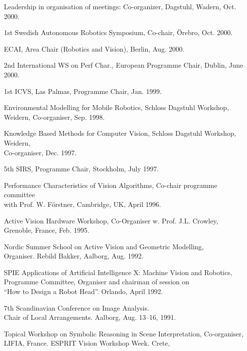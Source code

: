 \documentclass{article}
\begin{document}
\begin{cv}
\begin{cvlist}{Leadership in organisation of meetings:}
  Co-organizer, Dagstuhl, Wadern, \cftdotfill{\cftdotsep} Oct. 2000.
\item 1st Swedish Autonomous Robotics Symposium, Co-chair, \"Orebro,
  \cftdotfill{\cftdotsep}Oct. 2000.
\item ECAI, Area Chair (Robotics and Vision), Berlin,
  \cftdotfill{\cftdotsep} Aug. 2000.
\item 2nd International WS on Perf Char., European Programme Chair,
  Dublin,\cftdotfill{\cftdotsep} June 2000.
\item 1st ICVS, Las Palmas, Programme Chair, \cftdotfill{\cftdotsep}
  Jan. 1999.
\item Environmental Modelling for Mobile Robotics, Schloss Dagstuhl
  Workshop,\\ Weidern, Co-organiser, \cftdotfill{\cftdotsep}
  Sep. 1998.
\item Knowledge Based Methods for Computer Vision, Schloss Dagstuhl
  Workshop, Weidern,\\ Co-organiser, \cftdotfill{\cftdotsep}
  Dec. 1997.
\item 5th SIRS, Programme Chair, Stockholm, \cftdotfill{\cftdotsep}
  July 1997.
\item Performance Characteristics of Vision Algorithms, Co-chair
  programme committee\\ with Prof. W. F\"orstner, Cambridge, UK,
  \cftdotfill{\cftdotsep} April 1996.
\item Active Vision Hardware Workshop, Co-Organiser w. Prof. J.L.
  Crowley, \\Grenoble, France,\cftdotfill{\cftdotsep} Feb. 1995.
\item Nordic Summer School on Active Vision and Geometric Modelling,
  \\ Organiser. Rebild Bakker, Aalborg, \cftdotfill{\cftdotsep}
  Aug. 1992.
\item SPIE Applications of Artificial Intelligence X: Machine Vision
  and Robotics, \\ Programme Committee, Organiser and chairman of
  session on\\ ``How to Design a Robot Head''. Orlando,
  \cftdotfill{\cftdotsep} April 1992.
\item 7th Scandinavian Conference on Image Analysis. \\Chair of Local
  Arrangements. Aalborg, \cftdotfill{\cftdotsep} Aug. 13--16, 1991.
\item Topical Workshop on Symbolic Reasoning in Scene Interpretation,
  Co-organiser, \\LIFIA, France.  ESPRIT Vision Workshop Week. Crete,

\end{cvlist}
\end{cv}
\end{document}
